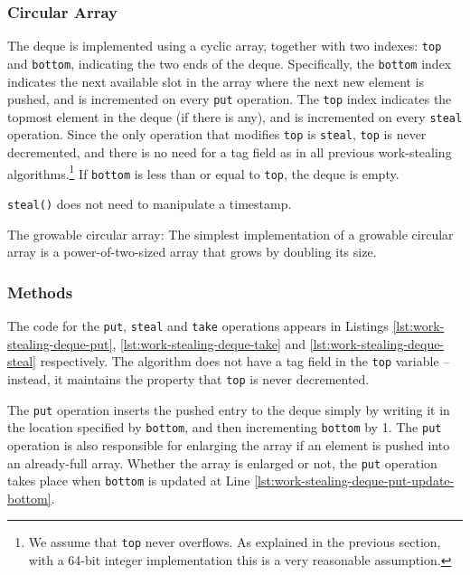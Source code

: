 \subsubsection{Circular Array}

The deque is implemented using a cyclic array, together with two
indexes: \lstinline!top! and \lstinline!bottom!, indicating the two
ends of the deque. Specifically, the \lstinline!bottom! index
indicates the next available slot in the array where the next new
element is pushed, and is incremented on every \lstinline!put!
operation. The \lstinline!top! index indicates the topmost element in
the deque (if there is any), and is incremented on every
\lstinline!steal! operation. Since the only operation that modifies
\lstinline!top! is \lstinline!steal!, \lstinline!top! is never
decremented, and there is no need for a tag field as in all previous
work-stealing algorithms.\footnote{We assume that \lstinline!top!
  never overflows. As explained in the previous section, with a 64-bit
  integer implementation this is a very reasonable assumption.} If
\lstinline!bottom! is less than or equal to \lstinline!top!, the deque
is empty.

\lstinline!steal()! does not need to manipulate a timestamp.

The growable circular array: The simplest implementation of a growable
circular array is a power-of-two-sized array that grows by doubling
its size.

\subsubsection{Methods}

The code for the \lstinline!put!, \lstinline!steal! and
\lstinline!take! operations appears in Listings
\ref{lst:work-stealing-deque-put}, \ref{lst:work-stealing-deque-take}
and \ref{lst:work-stealing-deque-steal} respectively. The algorithm
does not have a tag field in the \lstinline!top! variable -- instead,
it maintains the property that \lstinline!top! is never decremented.

The \lstinline!put! operation inserts the pushed entry to the deque
simply by writing it in the location specified by \lstinline!bottom!,
and then incrementing \lstinline!bottom! by 1. The \lstinline!put!
operation is also responsible for enlarging the array if an element is
pushed into an already-full array. Whether the array is enlarged or
not, the \lstinline!put! operation takes place when \lstinline!bottom!
is updated at Line \ref{lst:work-stealing-deque-put-update-bottom}.

